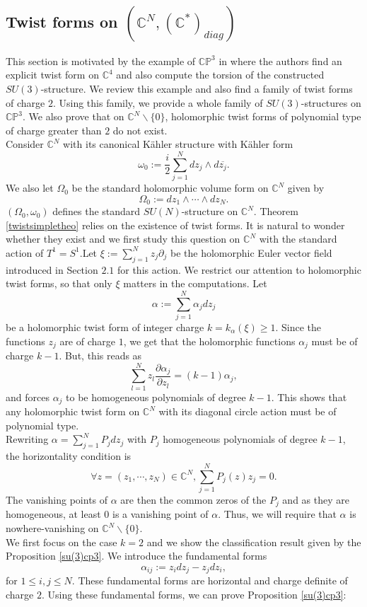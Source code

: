 \documentclass[12pt, reqno]{amsart}
\newcommand{\C}{\mathbb{C}}
\newcommand{\p}{\mathbb{P}}
\begin{document}
\subsection{Twist forms on $(\C^N,(\C^*)_{diag})$}
    This section is motivated by the example of $\C\p^3$ in \cite{Larfors_2013,Larfors_2010} where the authors find an explicit twist form on $\C^4$ and also compute the torsion of the constructed $SU(3)$-structure. We review this example and also find a family of twist forms of charge $2$. Using this family, we provide a whole family of $SU(3)$-structures on $\C\p^3$. We also prove that on $\C^N\backslash\{0\}$, holomorphic twist forms of polynomial type of charge greater than $2$ do not exist. \\
    \indent Consider $\C^N$ with its canonical Kähler structure with Kähler form \[\omega_0:=\frac{i}{2}\sum_{j=1}^Ndz_j\wedge d\overline{z_j}.\]\indent We also let $\Omega_0$ be the standard holomorphic volume form on $\C^N$ given by \[\Omega_0:=dz_1\wedge\cdots\wedge dz_N.\] \indent $(\Omega_0,\omega_0)$ defines the standard $SU(N)$-structure on $\C^N$. Theorem \ref{twistsimpletheo} relies on the existence of twist forms. It is natural to wonder whether they exist and we first study this question on $\C^N$ with the standard action of $T^1=S^1$.\newpage \indent Let $\xi:=\sum_{j=1}^Nz_j\partial_j$ be the holomorphic Euler vector field introduced in Section $2.1$ for this action. We restrict our attention to holomorphic twist forms, so that only $\xi$ matters in the computations. Let \[\alpha:=\sum_{j=1}^N\alpha_jdz_j\] be a holomorphic twist form of integer charge $k=k_\alpha(\xi)\geq 1$. Since the functions $z_j$ are of charge $1$, we get that the holomorphic functions $\alpha_j$ must be of charge $k-1$. But, this reads as \[\sum_{l=1}^Nz_l\frac{\partial\alpha_j}{\partial z_l}=(k-1)\alpha_j,\] and forces $\alpha_j$ to be homogeneous polynomials of degree $k-1$. This shows that any holomorphic twist form on $\C^N$ with its diagonal circle action must be of polynomial type. \\ \indent Rewriting $\alpha=\sum_{j=1}^NP_jdz_j$ with $P_j$ homogeneous polynomials of degree $k-1$, the horizontality condition is \[\forall z=(z_1,\cdots,z_N)\in\C^N, \sum_{j=1}^NP_j(z)z_j=0.\]
    \indent The vanishing points of $\alpha$ are then the common zeros of the $P_j$ and as they are homogeneous, at least $0$ is a vanishing point of $\alpha$. Thus, we will require that $\alpha$ is nowhere-vanishing on $\C^N\backslash\{0\}$. \\
    \indent We first focus on the case $k=2$ and we show the classification result given by the Proposition \ref{su(3)cp3}. We introduce the fundamental forms \[\alpha_{ij}:=z_idz_j-z_jdz_i,\] for $1\leq i,j\leq N$. These fundamental forms are horizontal and charge definite of charge $2$. Using these fundamental forms, we can prove Proposition \ref{su(3)cp3}:
\end{document}
